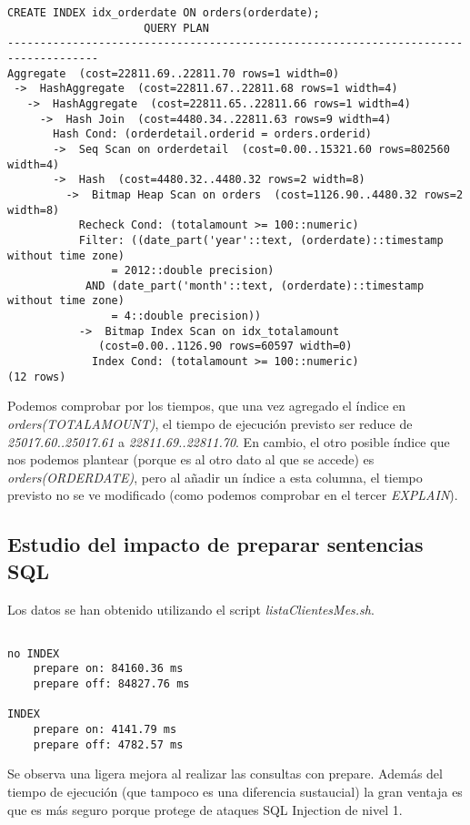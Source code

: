 \documentclass{article}
\begin{document}
\begin{Verbatim}
CREATE INDEX idx_orderdate ON orders(orderdate);
    				 QUERY PLAN
------------------------------------------------------------------------------------
Aggregate  (cost=22811.69..22811.70 rows=1 width=0)
 ->  HashAggregate  (cost=22811.67..22811.68 rows=1 width=4)
   ->  HashAggregate  (cost=22811.65..22811.66 rows=1 width=4)
     ->  Hash Join  (cost=4480.34..22811.63 rows=9 width=4)
       Hash Cond: (orderdetail.orderid = orders.orderid)
       ->  Seq Scan on orderdetail  (cost=0.00..15321.60 rows=802560 width=4)
       ->  Hash  (cost=4480.32..4480.32 rows=2 width=8)
         ->  Bitmap Heap Scan on orders  (cost=1126.90..4480.32 rows=2 width=8)
           Recheck Cond: (totalamount >= 100::numeric)
           Filter: ((date_part('year'::text, (orderdate)::timestamp without time zone)
           		= 2012::double precision)
           	AND (date_part('month'::text, (orderdate)::timestamp without time zone)
           		= 4::double precision))
           ->  Bitmap Index Scan on idx_totalamount
              (cost=0.00..1126.90 rows=60597 width=0)
             Index Cond: (totalamount >= 100::numeric)
(12 rows)

\end{Verbatim}

Podemos comprobar por los tiempos, que una vez agregado el índice en \textit{orders(TOTALAMOUNT)}, el tiempo de ejecución previsto ser reduce de \textit{25017.60..25017.61} a \textit{22811.69..22811.70}. En cambio, el otro posible índice que nos podemos plantear (porque es al otro dato al que se accede) es \textit{orders(ORDERDATE)}, pero al añadir un índice a esta columna, el tiempo previsto no se ve modificado (como podemos comprobar en el tercer \textit{EXPLAIN}).



\subsection{Estudio del impacto de preparar sentencias SQL}
Los datos se han obtenido utilizando el script \textit{listaClientesMes.sh}.

\begin{Verbatim}

no INDEX
	prepare on: 84160.36 ms
	prepare off: 84827.76 ms

INDEX
	prepare on: 4141.79 ms
	prepare off: 4782.57 ms

\end{Verbatim}

Se observa una ligera mejora al realizar las consultas con prepare. Además del tiempo de ejecución (que tampoco es una diferencia sustaucial) la gran ventaja es que es más seguro porque protege de ataques SQL Injection de nivel 1.
\end{document}
